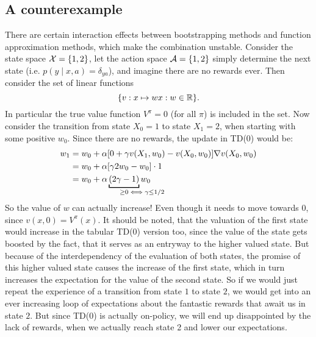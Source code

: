 \subsection{A counterexample}

There are certain interaction effects between bootstrapping methods and function approximation methods, which make the combination unstable. Consider the state space \(\mathcal{X}=\{1,2\}\), let the action space \(\mathcal{A}=\{1,2\}\) simply determine the next state (i.e. \(p(y\mid x,a)=\delta_{ya} \)), and imagine there are no rewards ever. Then consider the set of linear functions
\[
	\{v:x\mapsto w x :w\in\mathbb{R}\}.
\] 
In particular the true value function \(V^\pi=0\) (for all \(\pi\)) is included in the set. Now consider the transition from state \(X_0=1\) to state \(X_1=2\), when starting with some positive \(w_0\). Since there are no rewards, the update in TD(0) would be:
\begin{align*}
	w_1 
	&= w_0 + \alpha [0+\gamma v(X_1,w_0) - v(X_0,w_0)] \nabla v(X_0,w_0)\\
	&=w_0 + \alpha[\gamma 2w_0 - w_0] \cdot 1\\
	&=w_0 + \alpha \underbracket[1pt]{(2\gamma -1)}_{\ge 0 \mathrlap{\iff \gamma \le 1/2}} w_0
\end{align*}
So the value of \(w\) can actually increase! Even though it needs to move towards 0, since \(v(x,0)=V^\pi(x)\). It should be noted, that the valuation of the first state would increase in the tabular TD(0) version too, since the value of the state gets boosted by the fact, that it serves as an entryway to the higher valued state. But because of the interdependency of the evaluation of both states, the promise of this higher valued state causes the increase of the first state, which in turn increases the expectation for the value of the second state. So if we would just repeat the experience of a transition from state \(1\) to state \(2\), we would get into an ever increasing loop of expectations about the fantastic rewards that await us in state \(2\). But since TD(0) is actually on-policy, we will end up disappointed by the lack of rewards, when we actually reach state 2 and lower our expectations. 

